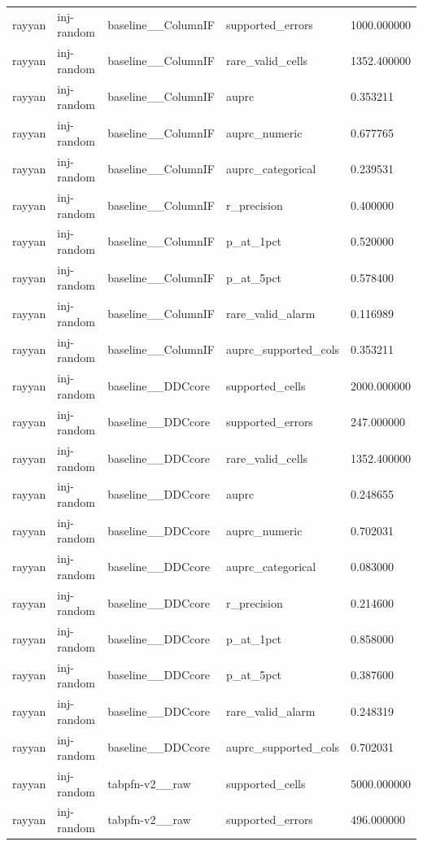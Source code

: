 \begin{tabular}{lllll}
rayyan & inj-random & baseline\_\_ColumnIF & supported\_errors & 1000.000000 \\
rayyan & inj-random & baseline\_\_ColumnIF & rare\_valid\_cells & 1352.400000 \\
rayyan & inj-random & baseline\_\_ColumnIF & auprc & 0.353211 \\
rayyan & inj-random & baseline\_\_ColumnIF & auprc\_numeric & 0.677765 \\
rayyan & inj-random & baseline\_\_ColumnIF & auprc\_categorical & 0.239531 \\
rayyan & inj-random & baseline\_\_ColumnIF & r\_precision & 0.400000 \\
rayyan & inj-random & baseline\_\_ColumnIF & p\_at\_1pct & 0.520000 \\
rayyan & inj-random & baseline\_\_ColumnIF & p\_at\_5pct & 0.578400 \\
rayyan & inj-random & baseline\_\_ColumnIF & rare\_valid\_alarm & 0.116989 \\
rayyan & inj-random & baseline\_\_ColumnIF & auprc\_supported\_cols & 0.353211 \\
rayyan & inj-random & baseline\_\_DDCcore & supported\_cells & 2000.000000 \\
rayyan & inj-random & baseline\_\_DDCcore & supported\_errors & 247.000000 \\
rayyan & inj-random & baseline\_\_DDCcore & rare\_valid\_cells & 1352.400000 \\
rayyan & inj-random & baseline\_\_DDCcore & auprc & 0.248655 \\
rayyan & inj-random & baseline\_\_DDCcore & auprc\_numeric & 0.702031 \\
rayyan & inj-random & baseline\_\_DDCcore & auprc\_categorical & 0.083000 \\
rayyan & inj-random & baseline\_\_DDCcore & r\_precision & 0.214600 \\
rayyan & inj-random & baseline\_\_DDCcore & p\_at\_1pct & 0.858000 \\
rayyan & inj-random & baseline\_\_DDCcore & p\_at\_5pct & 0.387600 \\
rayyan & inj-random & baseline\_\_DDCcore & rare\_valid\_alarm & 0.248319 \\
rayyan & inj-random & baseline\_\_DDCcore & auprc\_supported\_cols & 0.702031 \\
rayyan & inj-random & tabpfn-v2\_\_raw & supported\_cells & 5000.000000 \\
rayyan & inj-random & tabpfn-v2\_\_raw & supported\_errors & 496.000000 \\

\end{tabular}
